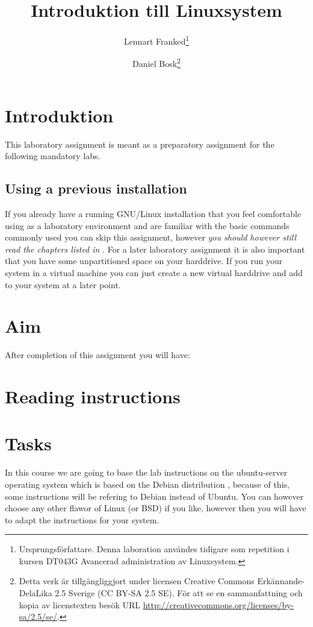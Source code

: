 \documentclass[a4paper]{miunasgn}
\title{Introduktion till Linuxsystem}
\author{Lennart Franked\footnote{%
    Ursprungsförfattare.
    Denna laboration användes tidigare som repetition i kursen DT043G Avancerad 
    administration av Linuxsystem.
  }
  \and
  Daniel Bosk\footnote{%
    Detta verk är tillgängliggjort under licensen Creative Commons 
    Erkännande-DelaLika 2.5 Sverige (CC BY-SA 2.5 SE).
    För att se en sammanfattning och kopia av licenstexten besök URL 
    \url{http://creativecommons.org/licenses/by-sa/2.5/se/}.
  }
}
\date{\svnId}
\begin{document}
\maketitle
\thispagestyle{foot}
\tableofcontents

\section{Introduktion}
\label{sec:intro}
This laboratory assignment is meant as a preparatory assignment for the following
mandatory labs.

\subsection{Using a previous installation}
If you already have a running GNU/Linux installation that you feel comfortable
using as a laboratory environment and are familiar with the 
basic commands commonly used you can skip this assignment, however 
\emph{you should however still read the chapters listed in 
  }.
For a later laboratory assignment it is also important that you have some 
unpartitioned space on your harddrive. If you run your system in a virtual 
machine you can just create a new virtual harddrive and add to your system at 
a later point.


\section{Aim}
\label{sec:aim}
After completion of this assignment you will have:
\begin{itemize}
  
\end{itemize}


\section{Reading instructions}
\label{sec:reading}



\section{Tasks}
\label{sec:work}
In this course we are going to base the lab instructions on the ubuntu-server
operating system which is based on the Debian distribution \citep{debian},
because of this, some instructions will be refering to Debian instead of
Ubuntu.
You can however choose any other flawor of Linux (or BSD) if you like, 
however then you will have to adapt the instructions for your system.
\end{document}
